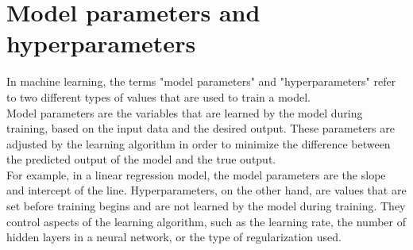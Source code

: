 \documentclass{article}
\begin{document}
\section{Model parameters and hyperparameters}
In machine learning, the terms "model parameters" and "hyperparameters" refer to two different types of values that are used to train a model.\\
Model parameters are the variables that are learned by the model during training, based on the input data and the desired output. These parameters are adjusted by the learning algorithm in order to minimize the difference between the predicted output of the model and the true output.\\
For example, in a linear regression model, the model parameters are the slope and intercept of the line.
Hyperparameters, on the other hand, are values that are set before training begins and are not learned by the model during training. They control aspects of the learning algorithm, such as the learning rate, the number of hidden layers in a neural network, or the type of regularization used.
\end{document}
